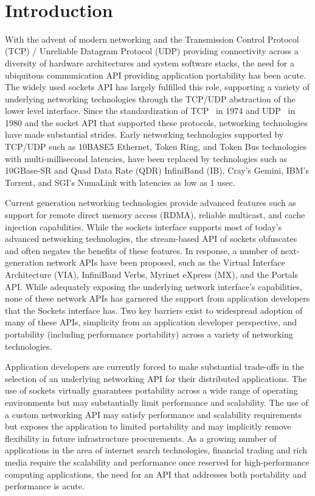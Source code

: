  \section{Introduction}


With the advent of modern networking and the Transmission Control
Protocol (TCP) / Unreliable Datagram Protocol (UDP) providing
connectivity across a diversity of hardware architectures and system
software stacks, the need for a ubiquitous communication API providing
application portability has been acute. The widely used sockets API
has largely fulfilled this role, supporting a variety of underlying
networking technologies through the TCP/UDP abstraction of the lower
level interface. Since the standardization of TCP~\cite{tcp-standard}
in 1974 and UDP~\cite{udp-standard} in 1980 and the socket API that
supported these protocols, networking technologies have made
substantial strides. Early networking technologies supported by
TCP/UDP such as 10BASE5 Ethernet, Token Ring, and Token Bus
technologies with multi-millisecond latencies, have been replaced by
technologies such as 10GBase-SR and Quad Data Rate (QDR) InfiniBand
(IB), Cray's Gemini, IBM's Torrent, and SGI's NumaLink  with latencies
as low as 1 usec. 

Current generation networking technologies provide advanced features
such as support for remote direct memory access (RDMA), reliable
multicast, and cache injection capabilities. While the sockets
interface supports most of today's advanced networking technologies,
the stream-based API of sockets obfuscates and often negates the
benefits of these features. In response, a number of next-generation
network APIs have been proposed, such as the Virtual Interface
Architecture (VIA), InfiniBand Verbs, Myrinet eXpress (MX), and the
Portals API. While adequately exposing the underlying network
interface's capabilities, none of these network APIs has garnered the
support from application developers that the Sockets interface
has. Two key barriers exist to widespread adoption of many of these
APIs, simplicity from an application developer perspective, and
portability (including performance portability) across a variety of
networking technologies. 

Application developers are currently forced to make substantial
trade-offs in the selection of an underlying networking API for their
distributed applications. The use of sockets virtually guarantees
portability across a wide range of operating environments but may
substantially limit performance and scalability. The use of a custom
networking API may satisfy performance and scalability requirements
but exposes the application to limited portability and may implicitly
remove flexibility in future infrastructure procurements. As a growing
number of applications in the area of internet search technologies,
financial trading and rich media require the scalability and
performance once reserved for high-performance computing applications,
the need for an API that addresses both portability and performance is
acute. 

